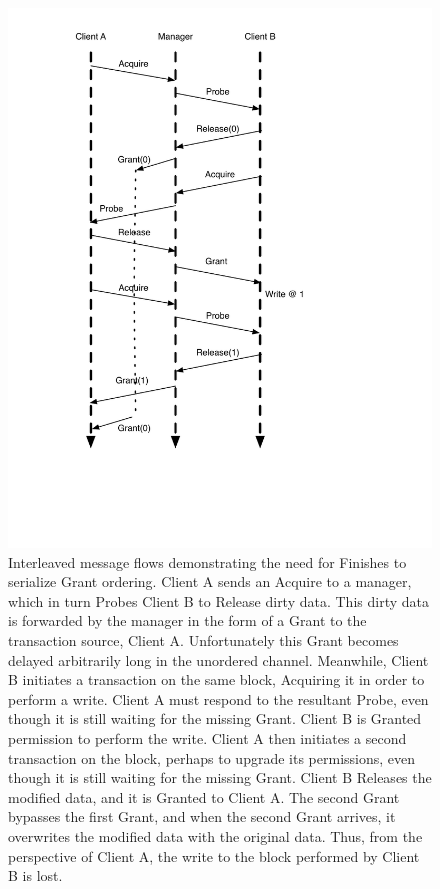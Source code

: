 \begin{figure}[!p]
\centering
\includegraphics[width=0.5\columnwidth]{tilelink/figures/unordered.pdf}
\caption{Interleaved message flows demonstrating the need for Finishes to serialize Grant ordering.
Client A sends an Acquire to a manager, which in turn Probes Client B to Release dirty data.
This dirty data is forwarded by the manager in the form of a Grant to the transaction source, Client A.
Unfortunately this Grant becomes delayed arbitrarily long in the unordered channel. 
Meanwhile, Client B initiates a transaction on the same block, Acquiring it in order to perform a write.
Client A must respond to the resultant Probe, even though it is still waiting for the missing Grant.
Client B is Granted permission to perform the write.
Client A then initiates a second transaction on the block, perhaps to upgrade its permissions, even though it is still waiting for the missing Grant.
Client B Releases the modified data, and it is Granted to Client A.
The second Grant bypasses the first Grant, and when the second Grant arrives, it overwrites the modified data with the original data.
Thus, from the perspective of Client A, the write to the block performed by Client B is lost.
}
\label{fig:unordered}
\end{figure}

